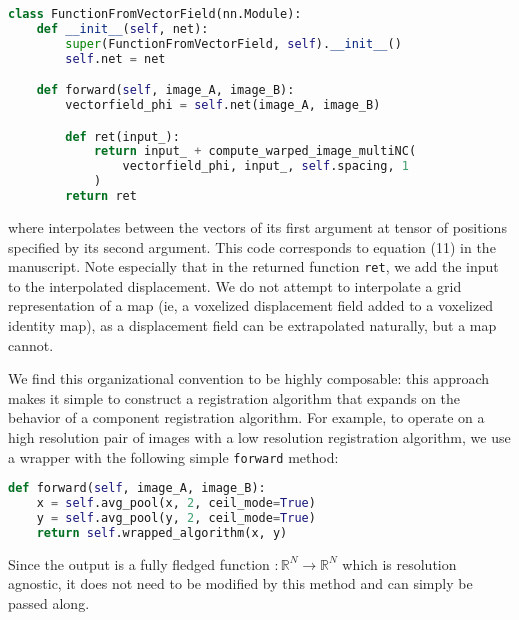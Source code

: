 \begin{lstlisting}[language=Python]
class FunctionFromVectorField(nn.Module):
    def __init__(self, net):
        super(FunctionFromVectorField, self).__init__()
        self.net = net

    def forward(self, image_A, image_B):
        vectorfield_phi = self.net(image_A, image_B)

        def ret(input_):
            return input_ + compute_warped_image_multiNC(
                vectorfield_phi, input_, self.spacing, 1
            )
        return ret
\end{lstlisting}
where  interpolates between the vectors of its first argument at tensor of positions specified by its second argument.
This code corresponds to equation (11) in the manuscript. Note especially that in the returned function \verb|ret|, we add the input to the interpolated displacement. We do not attempt to interpolate a grid representation of a map (ie, a voxelized displacement field added to a voxelized identity map), as a displacement field can be extrapolated naturally, but a map cannot.   

We find this organizational convention to be highly composable: this approach makes it simple to construct a registration algorithm that expands on the behavior of a component registration algorithm. For example, to operate on a high resolution pair of images with a low resolution registration algorithm, we use a wrapper with the following simple \verb|forward| method:

\begin{lstlisting}[language=Python]
def forward(self, image_A, image_B):
    x = self.avg_pool(x, 2, ceil_mode=True)
    y = self.avg_pool(y, 2, ceil_mode=True)
    return self.wrapped_algorithm(x, y)
\end{lstlisting}
Since the output is a fully fledged function $:\mathbb{R}^N \rightarrow \mathbb{R}^N$ which is resolution agnostic, it does not need to be modified by this method and can simply be passed along.

